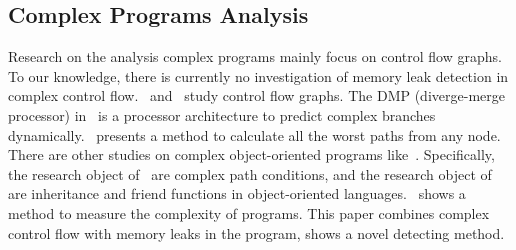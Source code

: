 \subsection{Complex Programs Analysis}
Research on the analysis complex programs mainly focus on control flow graphs. To our knowledge, there is currently no investigation of memory leak detection in complex control flow.~\cite{KJMP06} and~\cite{KFM13} study control flow graphs. The DMP (diverge-merge processor) in~\cite{KJMP06} is a processor architecture to predict complex branches dynamically.~\cite{KFM13} presents a method to calculate all the worst paths from any node. There are other studies on complex object-oriented programs like~\cite{LLQ16, MGDD14}. Specifically, the research object of~\cite{LLQ16} are complex path conditions, and the research object of~\cite{MGDD14} are inheritance and friend functions in object-oriented languages.~\cite{KK12} shows a method to measure the complexity of programs. This paper combines complex control flow with memory leaks in the program, shows a novel detecting method.
